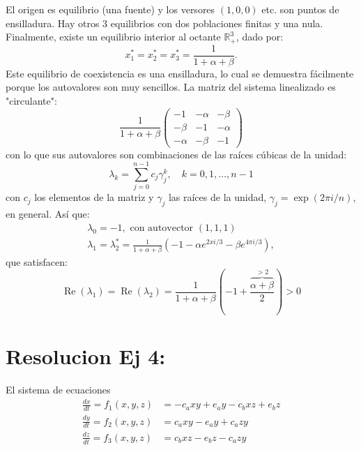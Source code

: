 \documentclass[twocolumn,aps,prl]{revtex4-1}
\begin{document}
El origen es equilibrio (una fuente) y los versores $(1,0,0)$ etc. son puntos de ensilladura. Hay otros 3 equilibrios con dos poblaciones finitas y una nula. Finalmente, existe un equilibrio interior al octante $\mathbb{R}_{+}^{3}$, dado por:
$$
x_{1}^{*}=x_{2}^{*}=x_{3}^{*}=\frac{1}{1+\alpha+\beta} .
$$
Este equilibrio de coexistencia es una ensilladura, lo cual se demuestra fácilmente porque los autovalores son muy sencillos. La matriz del sistema linealizado es "circulante":
$$
\frac{1}{1+\alpha+\beta}\left(\begin{array}{ccc}
-1 & -\alpha & -\beta \\
-\beta & -1 & -\alpha \\
-\alpha & -\beta & -1
\end{array}\right)
$$
con lo que sus autovalores son combinaciones de las raíces cúbicas de la unidad:
$$
\lambda_{k}=\sum_{j=0}^{n-1} c_{j} \gamma_{j}^{k}, \quad k=0,1, \ldots, n-1
$$
con $c_{j}$ los elementos de la matriz y $\gamma_{j}$ las raíces de la unidad, $\gamma_{j}=\exp (2 \pi i / n)$, en general. Así que:
$$
\begin{array}{c}
\lambda_{0}=-1, \text { con autovector }(1,1,1) \\
\lambda_{1}=\lambda_{2}^{*}=\frac{1}{1+\alpha+\beta}\left(-1-\alpha e^{2 x i / 3}-\beta e^{4 \pi i / 3}\right),
\end{array}
$$
que satisfacen:
$$
\operatorname{Re}\left(\lambda_{1}\right)=\operatorname{Re}\left(\lambda_{2}\right)=\frac{1}{1+\alpha+\beta}\left(-1+\frac{\overbrace{\alpha+\beta}^{>2}}{2}\right)>0
$$

% 
%                             
% 

\section{Resolucion Ej 4:}

El sistema de ecuaciones
$$
\begin{aligned}
\frac{d x}{d t} = f_1(x, y, z) &=-c_{a} x y+e_{a} y-c_{b} x z+e_{b} z \\
\frac{d y}{d t} = f_2(x, y, z) &=c_{a} x y-e_{a} y+c_{a} z y          \\
\frac{d z}{d t} = f_3(x, y, z) &=c_{b} x z-e_{b} z-c_{a} z y            
\end{aligned}
$$
\end{document}
